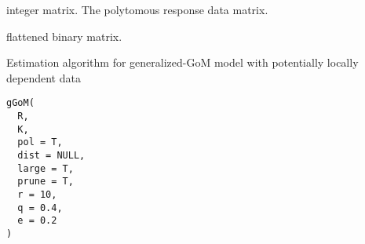 \documentclass[a4paper]{book}
\begin{document}
%
\begin{Arguments}
\begin{ldescription}
\item[\code{R}] integer matrix. The polytomous response data matrix.
\end{ldescription}
\end{Arguments}
%
\begin{Value}
\begin{description}

\item[    flattened binary matrix.] 
\end{description}

\end{Value}
%
\begin{Description}
Estimation algorithm for generalized-GoM model with potentially locally dependent data
\end{Description}
%
\begin{Usage}
\begin{verbatim}
gGoM(
  R,
  K,
  pol = T,
  dist = NULL,
  large = T,
  prune = T,
  r = 10,
  q = 0.4,
  e = 0.2
)
\end{verbatim}
\end{Usage}
%
\end{document}
